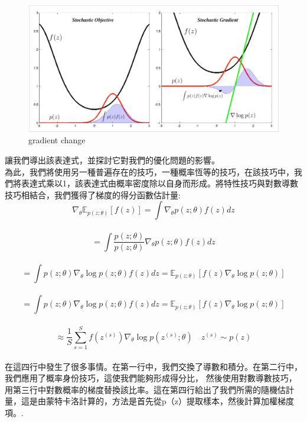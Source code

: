 \documentclass[14pt,a4paper]{report}  %
\begin{document}
\begin{figure}[hbt!]
\begin{center}
\includegraphics[scale=0.5]{gradient_change}
\caption{gradient change}%
\end{center}
\end{figure}
\qquad 讓我們導出該表達式，並探討它對我們的優化問題的影響。\\
\qquad 為此，我們將使用另一種普遍存在的技巧，一種概率恆等的技巧，在該技巧中，我們將表達式乘以1，該表達式由概率密度除以自身而形成。將特性技巧與對數導數技巧相結合，我們獲得了梯度的得分函數估計量:\\
$$\nabla_\theta \mathbb{E}_{p(z;\theta)}[f(z)]=\int\nabla_\theta p(z;\theta)f(z) dz$$\\[6pt]
$$= \int \frac{p(z;\theta)}{p(z;\theta)}\nabla_\theta p(z;\theta)f(z) dz$$\\[6pt]
$$=\int p(z;\theta)\nabla_\theta \log p(z;\theta)f(z) dz = \mathbb{E}_{p(z;\theta)}[f(z)\nabla_\theta \log p(z;\theta)]$$\\[6pt]
$$=\int p(z;\theta)\nabla_\theta \log p(z;\theta)f(z) dz = \mathbb{E}_{p(z;\theta)}[f(z)\nabla_\theta \log p(z;\theta)]$$\\[6pt]
$$\approx \frac{1}{S} \sum_{s=1}^{S}f(z^{(s)})\nabla_\theta \log p(z^{(s)};\theta) \quad z^{(s)}\sim p(z)$$\\[6pt]
在這四行中發生了很多事情。在第一行中，我們交換了導數和積分。在第二行中，我們應用了概率身份技巧，這使我們能夠形成得分比， 然後使用對數導數技巧，用第三行中對數概率的梯度替換該比率。這在第四行給出了我們所需的隨機估計量，這是由蒙特卡洛計算的，方法是首先從p（z）提取樣本，然後計算加權梯度項。.\\
\end{document}
